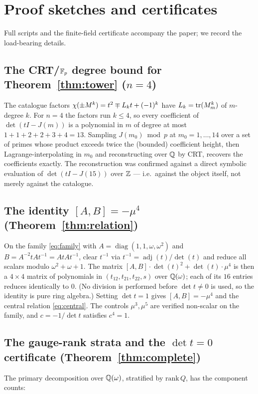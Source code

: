 \appendix

\section{Proof sketches and certificates}
\label{app:crt}\label{app:m4l}\label{app:strata}

Full scripts and the finite-field certificate accompany the paper; we record the load-bearing details.

\subsection{The CRT/$\mathbb{F}_p$ degree bound for Theorem~\ref{thm:tower} ($n=4$)} The catalogue factors
$\chi(\pm M^k)=t^2\mp L_k t+(-1)^k$ have $L_k=\operatorname{tr}(M_m^k)$ of $m$-degree $k$. For $n=4$ the factors run
$k\le4$, so every coefficient of $\det(tI-J(m))$ is a polynomial in $m$ of degree at most
$1+1+2+2+3+4=13$. Sampling $J(m_0)\bmod p$ at $m_0=1,\dots,14$ over a set of primes whose product exceeds
twice the (bounded) coefficient height, then Lagrange-interpolating in $m_0$ and reconstructing over $\mathbb{Q}$
by CRT, recovers the coefficients exactly. The reconstruction was confirmed against a direct symbolic
evaluation of $\det(tI-J(15))$ over $\mathbb{Z}$ --- i.e.\ against the object itself, not merely against the
catalogue.

\subsection{The identity $[A,B]=-\mu^4$ (Theorem~\ref{thm:relation})} On the family \eqref{eq:family} with
$A=\operatorname{diag}(1,1,\omega,\omega^2)$ and $B=A^{-2}tAt^{-1}=AtAt^{-1}$, clear $t^{-1}$ via
$t^{-1}=\operatorname{adj}(t)/\det(t)$ and reduce all scalars modulo $\omega^2+\omega+1$. The matrix
$[A,B]\cdot\det(t)^2+\det(t)\cdot\mu^4$ is then a $4\times4$ matrix of polynomials in
$(t_{12},t_{21},t_{22},s)$ over $\mathbb{Q}(\omega)$; each of its $16$ entries reduces identically to $0$. (No
division is performed before $\det t\neq0$ is used, so the identity is pure ring algebra.) Setting
$\det t=1$ gives $[A,B]=-\mu^4$ and the central relation \eqref{eq:central}. The controls $\mu^3,\mu^5$ are
verified non-scalar on the family, and $c=-1/\det t$ satisfies $c^4=1$.

\subsection{The gauge-rank strata and the $\det t=0$ certificate (Theorem~\ref{thm:complete})} The primary
decomposition over $\mathbb{Q}(\omega)$, stratified by $\mathrm{rank}\,Q$, has the component counts:

